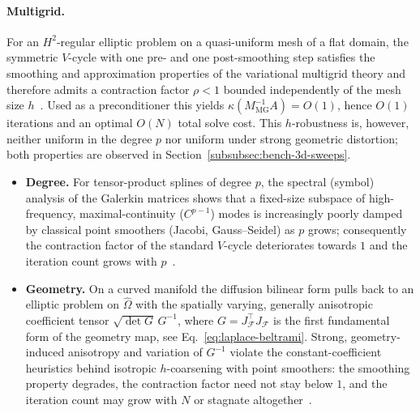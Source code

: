 \documentclass{article}
\newcommand{\refdom}{\widehat{\Omega}}            %
\newcommand{\gmap}{\mathcal{F}}                   %
\theoremstyle{plain}
\numberwithin{equation}{section}
\begin{document}
\paragraph{Multigrid.}
For an $H^{2}$-regular elliptic problem on a quasi-uniform mesh of a flat domain,
the symmetric $V$-cycle with one pre- and one post-smoothing step satisfies the
smoothing and approximation properties of the variational multigrid theory and
therefore admits a contraction factor $\rho<1$ bounded independently of the mesh
size $h$~\cite{trottenberg2000multigrid}.
Used as a preconditioner this yields $\kappa(M_{\mathrm{MG}}^{-1}A)=O(1)$, hence
$O(1)$ iterations and an optimal $O(N)$ total solve cost.
This $h$-robustness is, however, neither uniform in the degree $p$ nor uniform
under strong geometric distortion; both properties are observed in
Section~\ref{subsubsec:bench-3d-sweeps}.

\begin{itemize}
    \item[(i)] \textbf{Degree.}
          For tensor-product splines of degree $p$, the spectral (symbol) analysis of the
          Galerkin matrices shows that a fixed-size subspace of high-frequency,
          maximal-continuity ($C^{p-1}$) modes is increasingly poorly damped by classical
          point smoothers (Jacobi, Gauss--Seidel) as $p$ grows; consequently the
          contraction factor of the standard $V$-cycle deteriorates towards $1$ and the
          iteration count grows with $p$~\cite{donatelli2015robust,tielen2020pmultigrid}.
    \item[(ii)] \textbf{Geometry.}
          On a curved manifold the diffusion bilinear form pulls back to an elliptic
          problem on $\refdom$ with the spatially varying, generally anisotropic
          coefficient tensor $\sqrt{\det G}\,G^{-1}$, where $G=J_{\gmap}^{\top}J_{\gmap}$ is
          the first fundamental form of the geometry map, see Eq.~\eqref{eq:laplace-beltrami}.
          Strong, geometry-induced anisotropy and variation of $G^{-1}$ violate the
          constant-coefficient heuristics behind isotropic $h$-coarsening with point
          smoothers: the smoothing property degrades, the contraction factor need not stay
          below $1$, and the iteration count may grow with $N$ or stagnate
          altogether~\cite{trottenberg2000multigrid}.
\end{itemize}
\end{document}
